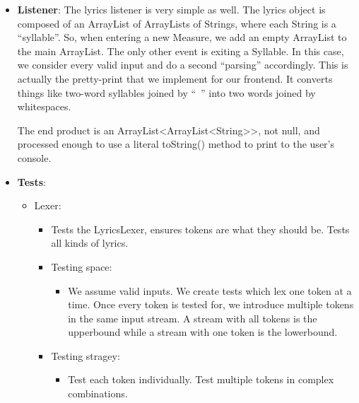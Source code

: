 \documentclass[12pt]{book}
\begin{document}
\begin{itemize}
\item {\bf Listener}: The lyrics listener is very simple as well. The lyrics object is composed of an ArrayList of ArrayLists of Strings, where each String is a ``syllable''. So, when entering a new Measure, we add an empty ArrayList to the main ArrayList. The only other event is exiting a Syllable. In this case, we consider every valid input and do a second ``parsing'' accordingly. This is actually the pretty-print that we implement for our frontend. It converts things like two-word syllables joined by ``~'' into two words joined by whitespaces.

The end product is an ArrayList<ArrayList<String>>, not null, and processed enough to use a literal toString() method to print to the user's console.

\item {\bf Tests}:
\begin{itemize}
\item Lexer:
\begin{itemize}
\item Tests the LyricsLexer, ensures tokens are what they should be. Tests all kinds of lyrics.

\item Testing space:

\begin{itemize} 
\item We assume valid inputs. We create tests which lex one token at a time. Once every token is tested for, we introduce multiple tokens in the same input stream. A stream with all tokens is the upperbound while a stream with one token is the lowerbound.
\end{itemize}

\item Testing stragey:

\begin{itemize}
\item Test each token individually. Test multiple tokens in complex combinations.
\end{itemize}
\end{itemize}

\end{itemize}

\end{itemize}

\newpage
\end{document}
